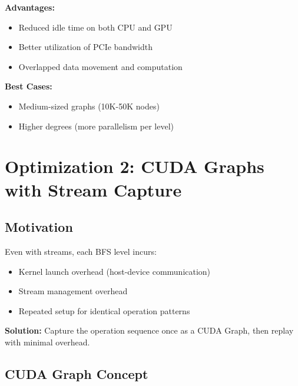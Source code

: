 \documentclass[11pt,a4paper]{article}
\begin{document}
\textbf{Advantages:}
\begin{itemize}
    \item Reduced idle time on both CPU and GPU
    \item Better utilization of PCIe bandwidth
    \item Overlapped data movement and computation
\end{itemize}

\textbf{Best Cases:}
\begin{itemize}
    \item Medium-sized graphs (10K-50K nodes)
    \item Higher degrees (more parallelism per level)
\end{itemize}

\section{Optimization 2: CUDA Graphs with Stream Capture}

\subsection{Motivation}

Even with streams, each BFS level incurs:
\begin{itemize}
    \item Kernel launch overhead (host-device communication)
    \item Stream management overhead
    \item Repeated setup for identical operation patterns
\end{itemize}

\textbf{Solution:} Capture the operation sequence once as a CUDA Graph, then replay with minimal overhead.

\subsection{CUDA Graph Concept}
\end{document}
